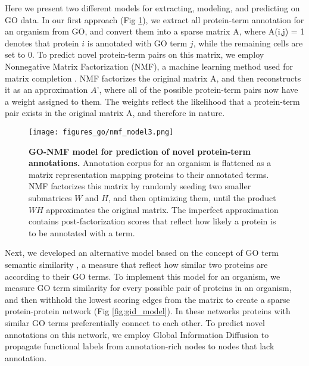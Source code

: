\documentclass[12pt,a4paper]{report}
\begin{document}
Here we present two different models for extracting, modeling, and predicting on GO data. In our first approach (Fig \ref{fig:nmf_model}), we extract all protein-term annotation for an organism from GO, and convert them into a sparse matrix A, where A(i,j) = 1 denotes that protein $i$ is annotated with GO term $j$, while the remaining cells are set to 0. To predict novel protein-term pairs on this matrix, we employ Nonnegative Matrix Factorization (NMF), a machine learning method used for matrix completion \cite{nmf_lee}. NMF factorizes the original matrix A, and then reconstructs it as an approximation $A’$, where all of the possible protein-term pairs now have a weight assigned to them. The weights reflect the likelihood that a protein-term pair exists in the original matrix A, and therefore in nature.

\begin{figure}
\begin{minipage}[c][\textheight]{\textwidth}
\centering
\vspace*{-4in}
  \texttt{[image: figures\_go/nmf\_model3.png]}
  \caption[GO-NMF model for prediction of novel protein-term annotations.]{\textbf{GO-NMF model for prediction of novel protein-term annotations.} Annotation corpus for an organism is flattened as a matrix representation mapping proteins to their annotated terms. NMF factorizes this matrix by randomly seeding two smaller submatrices $W$ and $H$, and then optimizing them, until the product $WH$ approximates the original matrix. The imperfect approximation contains post-factorization scores that reflect how likely a protein is to be annotated with a term.}
  \label{fig:nmf_model}
 \end{minipage}
\end{figure}
	
Next, we developed an alternative model based on the concept of GO term semantic similarity \cite{semantic_review}, a measure that reflect how similar two proteins are according to their GO terms. To implement this model for an organism, we measure GO term similarity for every possible pair of proteins in an organism, and then withhold the lowest scoring edges from the matrix to create a sparse protein-protein network (Fig \ref{fig:gid_model}). In these networks proteins with similar GO terms preferentially connect to each other. To predict novel annotations on this network, we employ Global Information Diffusion \cite{gid_basic} to propagate functional labels from annotation-rich nodes to nodes that lack annotation.
\end{document}

